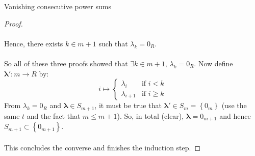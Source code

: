 \begin{appendixitem}{Vanishing consecutive power sums}
\begin{proof}
        \\\\
        Hence, there exists \( k \in m+1 \) such that \( \lambda_k = 0_{R} \).
        \\\\
        So all of these three proofs showed that \( \exists k \in m+1,\, \lambda_k = 0_{R} \). Now define \( \boldsymbol{\lambda}' \colon m \to R \) by:
        \[
            i \mapsto \begin{cases}
                \lambda_i & \text{if } i < k \\
                \lambda_{i+1} & \text{if } i \geq k
            \end{cases}
        \]
        From \( \lambda_k = 0_{R} \) and \( \boldsymbol{\lambda}\in S_{m+1} \), it must be true that \( \boldsymbol{\lambda}' \in S_m = \left\{0_m\right\} \) (use the same \( t \) and the fact that \( m \leq m+1 \)). So, in total (clear), \( \boldsymbol{\lambda} = 0_{m+1} \) and hence \( S_{m+1} \subset \left\{0_{m+1}\right\} \).
        \\\\
        This concludes the converse and finishes the induction step.
    \end{proof}
\end{appendixitem}
